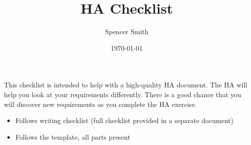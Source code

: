 \documentclass[12pt]{article}
\newcommand{\cmark}{\ding{51}}%
\newcommand{\xmark}{\ding{55}}%
\newcommand{\done}{\rlap{$\square$}{\raisebox{2pt}{\large\hspace{1pt}\cmark}}%
\hspace{-2.5pt}}
\newcommand{\wontfix}{\rlap{$\square$}{\large\hspace{1pt}\xmark}}
\begin{document}
\title{HA Checklist}
\author{Spencer Smith}
\date{\today}

\maketitle


This checklist is intended to help with a high-quality HA document. The HA will
help you look at your requirements differently.  There is a good chance that you
will discover new requirements as you complete the HA exercise.

\begin{itemize}

\item Follows writing checklist (full checklist provided in a separate document)

\item Follows the template, all parts present


\end{itemize}
\end{document}
